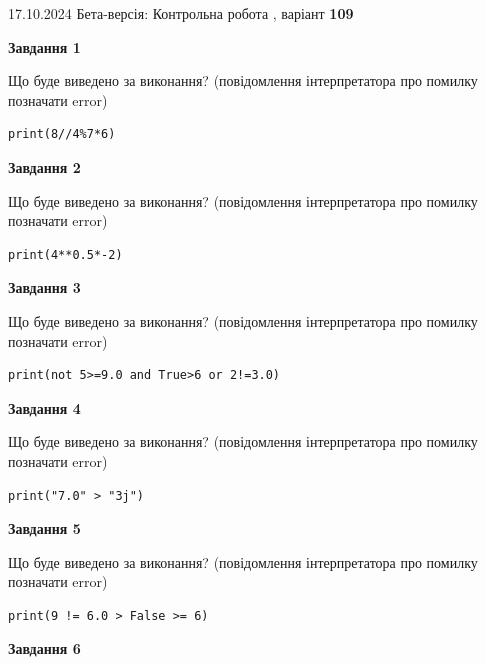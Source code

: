 \documentclass[12pt, ukrainian]{article}
\begin{document}
{\Large{17.10.2024 Бета-версія: Контрольна робота , варіант  \No \textbf { 109 }\par}}
{
\begin {large}
{\begin {center}\textbf{Завдання 1}\end {center}}

Що буде виведено за виконання? (повідомлення інтерпретатора про помилку позначати error)\par
\begin{verbatim}
print(8//4%7*6)
\end{verbatim}

{\begin {center}\textbf{Завдання 2}\end {center}}

Що буде виведено за виконання? (повідомлення інтерпретатора про помилку позначати error)\par
\begin{verbatim}
print(4**0.5*-2)
\end{verbatim}

{\begin {center}\textbf{Завдання 3}\end {center}}

Що буде виведено за виконання? (повідомлення інтерпретатора про помилку позначати error)\par
\begin{verbatim}
print(not 5>=9.0 and True>6 or 2!=3.0)
\end{verbatim}

{\begin {center}\textbf{Завдання 4}\end {center}}

Що буде виведено за виконання? (повідомлення інтерпретатора про помилку позначати error)\par
\begin{verbatim}
print("7.0" > "3j")
\end{verbatim}

{\begin {center}\textbf{Завдання 5}\end {center}}

Що буде виведено за виконання? (повідомлення інтерпретатора про помилку позначати error)\par
\begin{verbatim}
print(9 != 6.0 > False >= 6)
\end{verbatim}

{\begin {center}\textbf{Завдання 6}\end {center}}


\end{large}}
\end{document}
